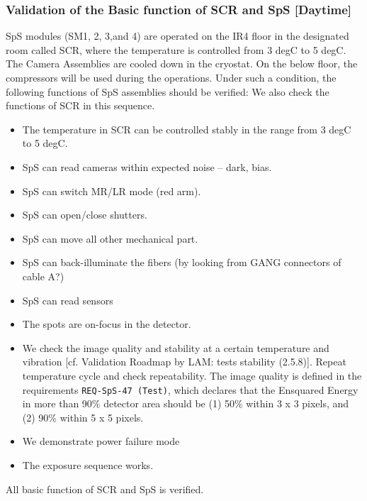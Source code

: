 \subsubsection{Validation of the Basic function of SCR and SpS [Daytime]}\label{secflow:SCR}

SpS modules (SM1, 2, 3,and 4) are operated on the IR4 floor in the designated room called SCR, where the temperature is controlled from 3 degC to 5 degC.
The Camera Assemblies are cooled down in the cryostat.
On the below floor, the compressors will be used during the operations.
Under such a condition, the following functions of SpS assemblies should be verified:
We  also check the functions of SCR in this sequence.
\begin{itemize}
\item The temperature in SCR can be controlled stably in the range from 3 degC to 5 degC.
\item SpS can read cameras within expected noise -- dark, bias.
\item SpS can switch MR/LR mode (red arm).
\item SpS can open/close shutters.
\item SpS can move all other mechanical part. 
\item SpS can back-illuminate the fibers (by looking from GANG connectors of cable A?)
\item SpS can read sensors
\item The spots are on-focus in the detector.
\item We check the image quality and stability at a certain temperature and vibration [cf. Validation Roadmap by LAM: tests stability (2.5.8)].
Repeat temperature cycle and check repeatability.
The image quality is defined in the requirements {\tt REQ-SpS-47 (Test)}, which declares that the Ensquared Energy in more than 90\% detector area should be (1) 50\% within 3 x 3 pixels, and (2) 90\% within 5 x 5 pixels.
\item We demonstrate power failure mode
\item The exposure sequence works.
\end{itemize}




\begin{itembox}[l]{}
All basic function of SCR and SpS is verified.
\end{itembox}